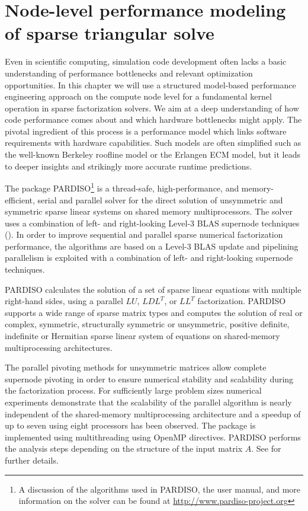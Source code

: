 \chapter{Node-level performance modeling of sparse triangular solve}
\label{c:modeling}

Even in scientific computing, simulation code development often lacks a basic understanding of performance bottlenecks and relevant optimization opportunities. In this chapter we will use a structured model-based performance engineering approach on the compute node level for a fundamental kernel operation in sparse factorization solvers. We aim at a deep understanding of how code performance comes about and which hardware bottlenecks might apply. The pivotal ingredient of this process is a performance model which links software requirements with hardware capabilities. Such models are often simplified such as the well-known Berkeley roofline model or the Erlangen ECM model, but it leads to deeper insights and strikingly more accurate runtime predictions.

The package PARDISO\footnote{A discussion of the algorithms used in
PARDISO, the user manual, and more information on the solver can be found at
\url{http://www.pardiso-project.org}}
is a thread-safe, high-performance, and memory-effi\-cient,
serial and parallel solver for the direct solution of unsymmetric
and symmetric sparse linear systems on shared memory multiprocessors.
The solver uses a combination
of left- and right-looking Level-3 BLAS supernode techniques
(\cite{AndBBDDDGHMOS99}).
In order to improve sequential and parallel sparse
numerical factorization performance, the algorithms are based on
a Level-3 BLAS update and pipelining parallelism is exploited with
a combination of left- and right-looking supernode techniques.

PARDISO calculates the solution of a set of sparse linear equations
with multiple right-hand sides, using a parallel $LU$, $LDL^T$, or $LL^T$
factorization. PARDISO supports a wide range of sparse matrix types and
computes the solution of real or complex,
symmetric, structurally symmetric or unsymmetric, positive definite,
indefinite or Hermitian sparse linear system of equations on shared-memory
multiprocessing architectures.

The parallel pivoting methods for unsymmetric matrices allow complete supernode pivoting in order to ensure numerical stability and scalability during the factorization process. For sufficiently large problem sizes numerical experiments demonstrate that the scalability of the parallel algorithm is nearly independent of the shared-memory multiprocessing architecture and a speedup of up to seven using eight processors has been observed. The package is implemented using multithreading using OpenMP directives. PARDISO performs the analysis steps depending on the structure
of the input matrix $A$. See \cite{Bollhofer2020} for further details.

